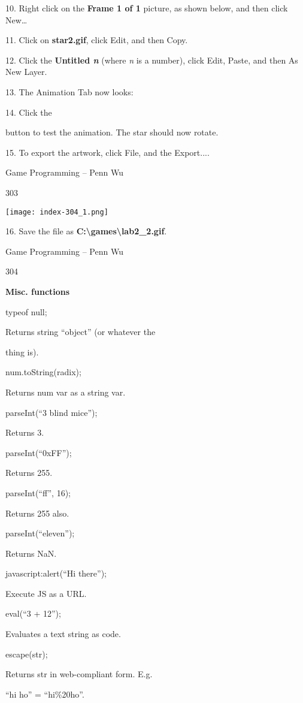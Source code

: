\documentclass[
]{article}
\begin{document}
10. Right click on the \textbf{Frame 1 of 1} picture, as shown below,
and then click New\ldots{}

11. Click on \textbf{star2.gif}, click Edit, and then Copy.

12. Click the \textbf{Untitled \emph{n}} \textbf{} (where \emph{n} is a
number), click Edit, Paste, and then As New Layer.

13. The Animation Tab now looks:

14. Click the

button to test the animation. The star should now rotate.

15. To export the artwork, click File, and the Export....

Game Programming -- Penn Wu

303

\protect\hypertarget{index_split_015.htmlux5cux23p304}{}{}\texttt{[image: index-304\_1.png]}

16. Save the file as
\textbf{C:\textbackslash games\textbackslash lab2\_2.gif}.

Game Programming -- Penn Wu

304

\protect\hypertarget{index_split_015.htmlux5cux23p305}{}{}\textbf{Misc.
functions}

typeof null;

Returns string ``object'' (or whatever the

thing is).

num.toString(radix);

Returns num var as a string var.

parseInt(``3 blind mice'');

Returns 3.

parseInt(``0xFF'');

Returns 255.

parseInt(``ff'', 16);

Returns 255 also.

parseInt(``eleven'');

Returns NaN.

javascript:alert(``Hi there'');

Execute JS as a URL.

eval(``3 + 12'');

Evaluates a text string as code.

escape(str);

Returns str in web-compliant form. E.g.

``hi ho'' = ``hi\%20ho''.
\end{document}
